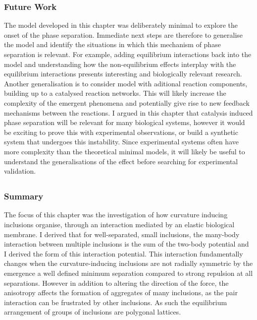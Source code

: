 \subsubsection{Future Work}

The model developed in this chapter was deliberately minimal to explore the onset of the phase separation. Immediate next steps are therefore to generalise the model and identify the situations in which this mechanism of phase separation is relevant. For example, adding equilibrium interactions back into the model and understanding how the non-equilibrium effects interplay with the equilibrium interactions presents interesting and biologically relevant research. Another generalisation is to consider model with aditional reaction components, building up to a catalysed reaction networks. This will likely increase the complexity of the emergent phenomena and potentially give rise to new feedback mechanisms between the reactions. I argued in this chapter that catalysis induced phase separation will be relevant for many biological systems, however it would be exciting to prove this with experimental observations, or build a synthetic system that undergoes this instability. Since experimental systems often have more complexity than the theoretical minimal models, it will likely be useful to understand the generalisations of the effect before searching for experimental validation.

\subsection{\chelastic}

\subsubsection{Summary}
The focus of this chapter was the investigation of how curvature inducing inclusions organise, through an interaction mediated by an elastic biological membrane. I derived that for well-separated, small inclusions, the many-body interaction between multiple inclusions is the sum of the two-body potential and I derived the form of this interaction potential. This interaction fundamentally changes when the curvature-inducing inclusions are not radially symmetric by the emergence a well defined minimum separation compared to strong repulsion at all separations. However in addition to altering the direction of the force, the anisotropy affects the formation of aggregates of many inclusions, as the pair interaction can be frustrated by other inclusions. As such the equilibrium arrangement of groups of inclusions are polygonal lattices.

